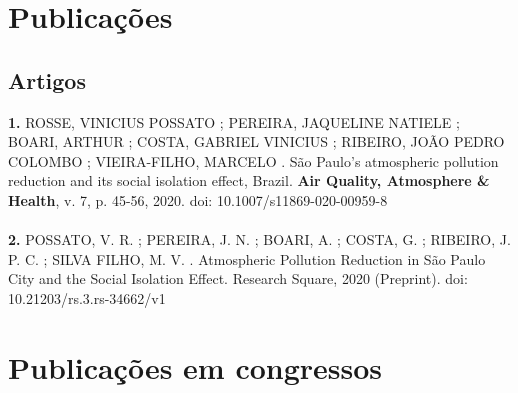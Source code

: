\documentclass[12pt,a4paper,sans]{moderncv}        %
\renewcommand*{\bibliographyitemlabel}{[\arabic{enumiv}]}
\begin{document}
	
	
	\section{Publicações}
	\subsection*{Artigos}
\textbf{1.}	ROSSE, VINICIUS POSSATO ; PEREIRA, JAQUELINE NATIELE ; BOARI, ARTHUR ; COSTA, GABRIEL VINICIUS ; RIBEIRO, JOÃO PEDRO COLOMBO ; VIEIRA-FILHO, MARCELO . São Paulo's atmospheric pollution reduction and its social isolation effect, Brazil. \textbf{Air Quality, Atmosphere \& Health}, v. 7, p. 45-56, 2020. doi: 10.1007/s11869-020-00959-8
\\ \\
\textbf{2.} POSSATO, V. R. ; PEREIRA, J. N. ; BOARI, A. ; COSTA, G. ; RIBEIRO, J. P. C. ; SILVA FILHO, M. V. . Atmospheric Pollution Reduction in São Paulo City and the Social Isolation Effect. Research Square, 2020 (Preprint). doi: 10.21203/rs.3.rs-34662/v1

	\section*{Publicações em congressos}
	
	
	\clearpage
\end{document}
